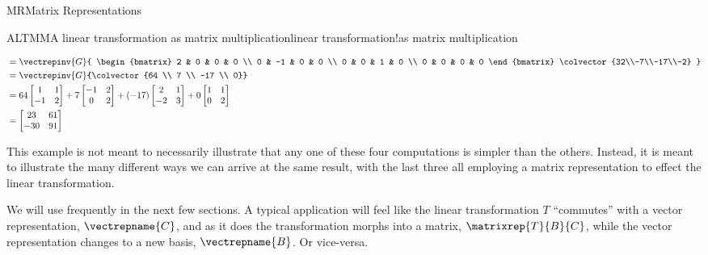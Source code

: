 \begin{subsect}{MR}{Matrix Representations}
\begin{example}{ALTMM}{A linear transformation as matrix multiplication}{linear transformation!as matrix multiplication}
\begin{para}
\begin{align*}
%
&=\vectrepinv{G}{
\begin{bmatrix}
2 & 0 & 0 & 0 \\
0 & -1 & 0 & 0 \\
0 & 0 & 1 & 0 \\
0 & 0 & 0 & 0
\end{bmatrix}
\colvector{32\\-7\\-17\\-2}
}\\
%
&=\vectrepinv{G}{\colvector{64 \\ 7 \\ -17 \\ 0}}\\
%
&=
64\begin{bmatrix}1&1\\-1&2\end{bmatrix}+
7\begin{bmatrix}-1&2\\0&2\end{bmatrix}+
(-17)\begin{bmatrix}2&1\\-2&3\end{bmatrix}+
0\begin{bmatrix}1&1\\0&2\end{bmatrix}\\
%
&=
\begin{bmatrix}
23 & 61 \\ -30 & 91
\end{bmatrix}
\end{align*}
\end{para}
%
\begin{para}This example is not meant to necessarily illustrate that any one of these four computations is simpler than the others.  Instead, it is meant to illustrate the many different ways we can arrive at the same result, with the last three all employing a matrix representation to effect the linear transformation.\end{para}
%
\end{example}
%
\begin{para}We will use  frequently in the next few sections.  A typical application will feel like the linear transformation $T$ ``commutes'' with a vector representation, $\vectrepname{C}$, and as it does the transformation morphs into a matrix, $\matrixrep{T}{B}{C}$, while the vector representation changes to a new basis, $\vectrepname{B}$.  Or vice-versa.\end{para}
%
%
\end{subsect}
